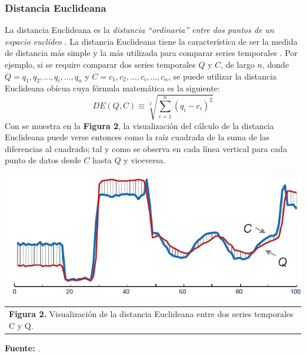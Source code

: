 \subsubsection{\textbf{Distancia Euclideana}}
La distancia Euclideana es la \textit{distancia \enquote{ordinaria} entre dos puntos de un espacio eucl\'ideo} \cite{euclidean}. 
La distancia Euclideana tiene la caracter\'istica de ser la medida de distancia m\'as simple y la m\'as utilizada para comparar series temporales \cite{motifs}. Por ejemplo, si se require comparar dos series temporales $Q$ y $C$, de largo $n$, donde\\ $Q = q_1, q_2, ..., q_i, ..., q_n$ y $C = c_1, c_2, ..., c_i, ..., c_n$, se puede utilizar la distancia Euclideana ob\'icua cuya f\'ormula matem\'atica es la siguiente: 
\begin{equation}
DE(Q, C) \equiv \sqrt[2]{\sum\limits_{i=1}^{n}{(q_i - c_i)}^2}
\end{equation}
Con se muestra en la \textbf{Figura 2}, la visualizaci\'on del c\'alculo de la distancia Euclideana puede verse entonces como la ra\'iz cuadrada de la suma de las diferencias al cuadrado; tal y como se observa en cada l\'inea vertical para cada punto de datos desde $C$ hasta $Q$ y viceversa.
\begin{center}
\includegraphics[scale=0.7]{euclidean.png}\\
\vspace*{10pt}
\begin{tabular}{l}
\footnotesize{\textbf{Figura 2.} Visualizaci\'on de la distancia Euclideana entre dos series temporales C y Q.}\\ 
\end{tabular}{}
\textbf{Fuente:} \cite{euclidean}.
\end{center}
